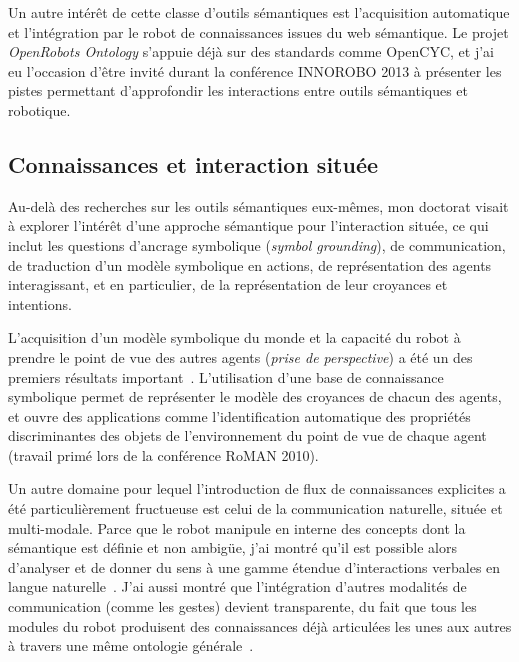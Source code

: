 \documentclass[a4paper]{article}
\begin{document}
Un autre intérêt de cette classe d'outils sémantiques est l'acquisition
automatique et l'intégration par le robot de connaissances issues du web
sémantique. Le projet \emph{OpenRobots Ontology} s'appuie déjà sur des
standards comme {\sc OpenCYC}, et j'ai eu l'occasion d'être invité durant la
conférence INNOROBO 2013 à présenter les pistes permettant d'approfondir les
interactions entre outils sémantiques et robotique.

\subsection*{Connaissances et interaction située%
  \label{semantic-tools-for-grounded-interaction}%
}

Au-delà des recherches sur les outils sémantiques eux-mêmes, mon doctorat visait à
explorer l'intérêt d'une approche sémantique pour l'interaction située, ce qui
inclut les questions d'ancrage symbolique (\emph{symbol grounding}), de
communication, de traduction d'un modèle symbolique en actions, de
représentation des agents interagissant, et en particulier, de la représentation
de leur croyances et intentions.

L'acquisition d'un modèle symbolique du monde et la capacité du robot à prendre
le point de vue des autres agents (\emph{prise de perspective}) a été un des
premiers résultats important~\cite{lemaignan2011anchoring}.  L'utilisation d'une base de
connaissance symbolique permet de représenter le modèle des croyances de chacun
des agents, et ouvre des applications comme l'identification automatique des
propriétés discriminantes des objets de l'environnement du point de vue de
chaque agent~\cite{ros2010which} (travail primé lors de la conférence RoMAN 2010).

Un autre domaine pour lequel l'introduction de flux de connaissances explicites
a été particulièrement fructueuse est celui de la communication naturelle,
située et multi-modale. Parce que le robot manipule en interne des concepts dont
la sémantique est définie et non ambigüe, j'ai montré qu'il est possible alors
d'analyser et de donner du sens à une gamme étendue d'interactions verbales en
langue naturelle~\cite{ros2010robot, lemaignan2011dialogue, lemaignan2013talking}.
J'ai aussi montré que l'intégration d'autres modalités de communication (comme
les gestes) devient transparente, du fait que tous les modules du robot
produisent des connaissances déjà articulées les unes aux autres à travers une
même ontologie générale~\cite{lemaignan2011what, lemaignan2011grounding}.
\end{document}
